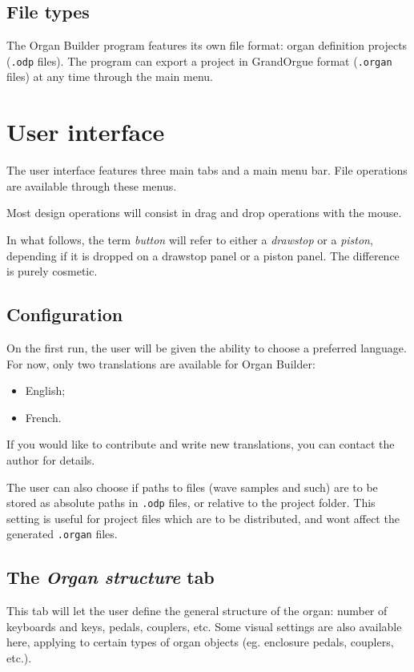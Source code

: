 \documentclass[a4paper,twoside,12pt]{extarticle}
\begin{document}
\subsection{File types}

The Organ Builder program features its own file format: organ definition projects (\verb|.odp| files). The program can export a project in GrandOrgue format (\verb|.organ| files) at any time through the main menu.

\section{User interface}

The user interface features three main tabs and a main menu bar. File operations are available through these menus.

Most design operations will consist in drag and drop operations with the mouse.

In what follows, the term \textit{button} will refer to either a \textit{drawstop} or a \textit{piston}, depending if it is dropped on a drawstop panel or a piston panel. The difference is purely cosmetic.

\subsection{Configuration}

On the first run, the user will be given the ability to choose a preferred language. For now, only two translations are available for Organ Builder:
\begin{itemize}
\item English;
\item French.
\end{itemize}
If you would like to contribute and write new translations, you can contact the author for details.

The user can also choose if paths to files (wave samples and such) are to be stored as absolute paths in \verb|.odp| files, or relative to the project folder. This setting is useful for project files which are to be distributed, and wont affect the generated \verb|.organ| files.

\subsection{The \textit{Organ structure} tab}

This tab will let the user define the general structure of the organ: number of keyboards and keys, pedals, couplers, etc. Some visual settings are also available here, applying to certain types of organ objects (eg. enclosure pedals, couplers, etc.).
\end{document}
